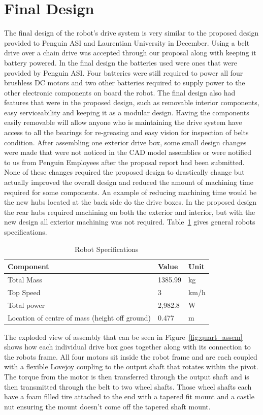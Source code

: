 \section{Final Design}
The final design of the robot's drive system is very similar to the proposed design provided to Penguin ASI and Laurentian University in December. Using a belt drive over a chain drive was accepted through our proposal along with keeping it battery powered. In the final design the batteries used were ones that were provided by Penguin ASI. Four batteries were still required to power all four brushless DC motors and two other batteries required to supply power to the other electronic components on board the robot. The final design also had features that were in the proposed design, such as removable interior components, easy serviceability and keeping it as a modular design. Having the components easily removable will allow anyone who is maintaining the drive system have access to all the bearings for re-greasing and easy vision for inspection of belts condition.  After assembling one exterior drive box, some small design changes were made that were not noticed in the CAD model assemblies or were notified to us from Penguin Employees after the proposal report had been submitted. None of these changes required the proposed design to drastically change but actually improved the overall design and reduced the amount of machining time required for some components. An example of reducing machining time would be the new hubs located at the back side do the drive boxes. In the proposed design the rear hubs required machining on both the exterior and interior, but with the new design all exterior machining was not required. Table~\ref{tab:specs} gives general robots specifications.

\begin{table}[htbp]
\centering
\caption{Robot Specifications}
\begin{tabular}{| p{5cm}ll |} \hline
Component & Value & Unit \\ \hline
Total Mass & 1385.99 & kg \\
Top Speed & 3	& km/h \\
Total power & 2,982.8 & W \\
Location of centre of mass (height off ground) & 0.477 & m\\ \hline
 \end{tabular}
 \label{tab:specs}
 \end{table}

The exploded view of assembly that can be seen in Figure~\ref{fig:quart_assem} shows how each individual drive box goes together along with its connection to the robots frame. All four motors sit inside the robot frame and are each coupled with a flexible Lovejoy coupling to the output shaft that rotates within the pivot. The torque from the motor is then transferred through the output shaft and is then transmitted through the belt to two wheel shafts. Those wheel shafts each have a foam filled tire attached to the end with a tapered fit mount and a castle nut ensuring the mount doesn't come off the tapered shaft mount.

